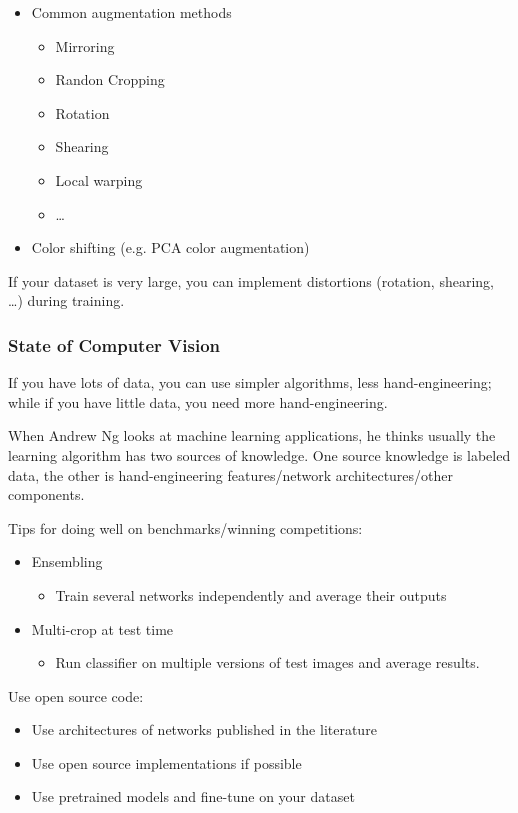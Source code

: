 \documentclass[UTF8]{article}
\begin{document}
\begin{itemize}
    \item Common augmentation methods
    \begin{itemize}
        \item Mirroring
        \item Randon Cropping
        \item Rotation
        \item Shearing
        \item Local warping
        \item \ldots
    \end{itemize}
    \item Color shifting (e.g. PCA color augmentation)
\end{itemize}

If your dataset is very large, you can implement distortions (rotation, shearing, \ldots) during
training.

\subsubsection{State of Computer Vision}
If you have lots of data, you can use simpler algorithms, less hand-engineering; while if you have
little data, you need more hand-engineering.

When Andrew Ng looks at machine learning applications, he thinks usually the learning algorithm has
two sources of knowledge. One source knowledge is labeled data, the other is hand-engineering
features/network architectures/other components.

Tips for doing well on benchmarks/winning competitions:
\begin{itemize}
    \item Ensembling
    \begin{itemize}
        \item Train several networks independently and average their outputs
    \end{itemize}
    \item Multi-crop at test time
    \begin{itemize}
        \item Run classifier on multiple versions of test images and average results.
    \end{itemize}
\end{itemize}

Use open source code:
\begin{itemize}
    \item Use architectures of networks published in the literature
    \item Use open source implementations if possible
    \item Use pretrained models and fine-tune on your dataset
\end{itemize}
\end{document}
